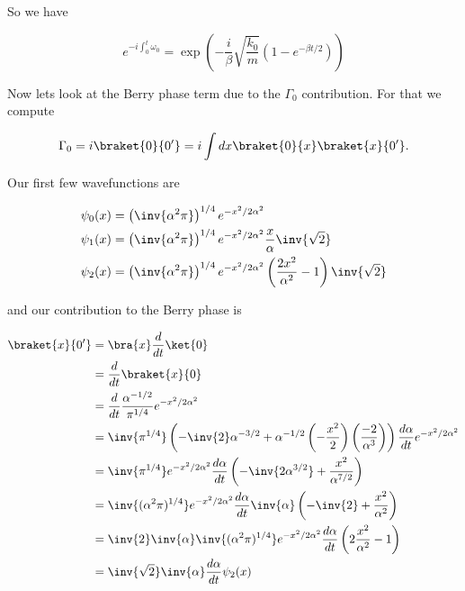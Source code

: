 So we have

\begin{equation}\label{eqn:qmTwoExamReflection:790}
e^{-i \int_0^t \omega_0}
=
\exp\left(
- \frac{i}{\beta} \sqrt{\frac{k_0}{m}} 
\left( 1 - e^{-\beta t/2} \right)
\right)
\end{equation}

Now lets look at the Berry phase term due to the $\Gamma_0$ contribution.  For that we compute

\begin{equation}\label{eqn:qmTwoExamReflection:850}
\Gamma_0 
= i \braket{0}{0'} 
= i \int dx \braket{0}{x} \braket{x}{0'}.
\end{equation}

%
%

Our first few wavefunctions are

\begin{align}\label{eqn:qmTwoExamReflection:830}
\psi_0(x) 
&=
\left(\inv{\alpha^2\pi}\right)^{1/4} e^{- x^2/2 \alpha^2} \\
\psi_1(x) 
&=
\left(\inv{\alpha^2\pi}\right)^{1/4} e^{- x^2/2 \alpha^2} \frac{x}{\alpha} \inv{\sqrt{2}} \\
\psi_2(x) 
&=
\left(\inv{\alpha^2\pi}\right)^{1/4} e^{- x^2/2 \alpha^2} \left( \frac{2 x^2}{\alpha^2} - 1 \right) \inv{\sqrt{2}}
\end{align}

and our contribution to the Berry phase is

\begin{align*}
\braket{x}{0'} 
&=
\bra{x}\frac{d}{dt} \ket{0} \\
&=
\frac{d}{dt} \braket{x}{0} \\
&=
\frac{d}{dt} \frac{\alpha^{-1/2}}{\pi^{1/4}} e^{ - x^2/2 \alpha^2} \\
&=
\inv{\pi^{1/4}}
\left(
  -\inv{2} \alpha^{-3/2}
  + 
  \alpha^{-1/2} \left(-\frac{x^2}{2}\right) \left( \frac{-2}{\alpha^3}\right) 
\right) 
\frac{d\alpha}{dt} 
e^{ - x^2/2 \alpha^2} \\
&=
\inv{\pi^{1/4}} 
e^{ - x^2/2 \alpha^2} 
\frac{d\alpha}{dt} 
\left(
-\inv{2 \alpha^{3/2}} + \frac{x^2}{\alpha^{7/2}}
\right) \\
&=
\inv{(\alpha^2 \pi)^{1/4}} 
e^{ - x^2/2 \alpha^2} 
\frac{d\alpha}{dt} 
\inv{\alpha}
\left(
-\inv{2} + \frac{x^2}{\alpha^2}
\right) \\
&=
\inv{2}
\inv{\alpha}
\inv{(\alpha^2 \pi)^{1/4}} 
e^{ - x^2/2 \alpha^2} 
\frac{d\alpha}{dt} 
\left(
2 \frac{x^2}{\alpha^2} - 1
\right) \\
&=
\inv{\sqrt{2}} \inv{\alpha} 
\frac{d\alpha}{dt} 
\psi_2(x)
\end{align*}

